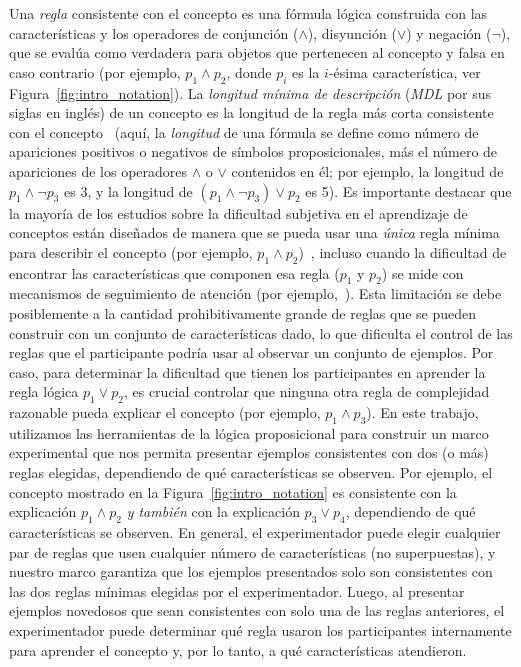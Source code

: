 Una \textit{regla} consistente con el concepto es una fórmula lógica construida con las características y los operadores de conjunción ($\land$), disyunción ($\lor$) y negación ($\lnot$), que se evalúa como verdadera para objetos que pertenecen al concepto y falsa en caso contrario (por ejemplo, $p_1 \land p_2$, donde $p_i$ es la $i$-ésima característica, ver Figura~\ref{fig:intro_notation}). La \textit{longitud mínima de descripción} (\textit{MDL} por sus siglas en inglés) de un concepto es la longitud de la regla más corta consistente con el concepto~\cite{grunwald2007minimum} (aquí, la {\em longitud} de una fórmula se define como número de apariciones positivos o negativos de símbolos proposicionales, más el número de apariciones de los operadores $\land$ o $\lor$ contenidos en él; por ejemplo, la longitud de $p_1 \land \lnot p_3 $ es 3, y la longitud de $(p_1 \land \lnot p_3) \lor p_2$ es 5). Es importante destacar que la mayoría de los estudios sobre la dificultad subjetiva en el aprendizaje de conceptos están diseñados de manera que se pueda usar una {\em única} regla mínima para describir el concepto (por ejemplo, $p_1 \land p_2$)~\cite{ashby2005human,feldman2000minimization}, incluso cuando la dificultad de encontrar las características que componen esa regla ($p_1$ y $p_2$) se mide con mecanismos de seguimiento de atención (por ejemplo,~\cite{blair2009extremely, hoffman2010costs}). Esta limitación se debe posiblemente a la cantidad prohibitivamente grande de reglas que se pueden construir con un conjunto de características dado, lo que dificulta el control de las reglas que el participante podría usar al observar un conjunto de ejemplos. Por caso, para determinar la dificultad que tienen los participantes en aprender la regla lógica $p_1 \lor p_2$, es crucial controlar que ninguna otra regla de complejidad razonable pueda explicar el concepto (por ejemplo, $p_1 \land p_3$). En este trabajo, utilizamos las herramientas de la lógica proposicional para construir un marco experimental que nos permita presentar ejemplos consistentes con dos (o más) reglas elegidas, dependiendo de qué características se observen. Por ejemplo, el concepto mostrado en la Figura~\ref{fig:intro_notation} es consistente con la explicación $p_1 \land p_2$ \textit {y también} con la explicación $p_3 \lor p_4$, dependiendo de qué características se observen. En general, el experimentador puede elegir cualquier par de reglas que usen cualquier número de características (no superpuestas), y nuestro marco garantiza que los ejemplos presentados solo son consistentes con las dos reglas mínimas elegidas por el experimentador. Luego, al presentar ejemplos novedosos que sean consistentes con solo una de las reglas anteriores, el experimentador puede determinar qué regla usaron los participantes internamente para aprender el concepto y, por lo tanto, a qué características atendieron.


